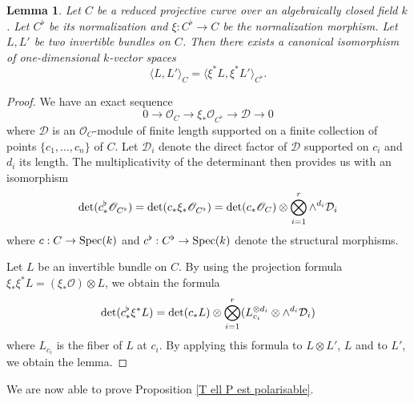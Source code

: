 \documentclass[12pt,english]{smfart}
\numberwithin{equation}{subsection}
\newtheorem{lemme}[equation]{Lemma}
\theoremstyle{remark}
\newcommand\calO{{\mathscr O}}
\newcommand\Spec{{\rm Spec}}
\begin{document}
\begin{lemme}\label{normalisation Weil pairing}
Let $C$ be a reduced projective curve over an algebraically closed field $k$. Let $C^\flat$ be its normalization and $\xi:C^\flat \rightarrow C$ be the normalization morphism. Let $L,L'$ be two invertible bundles on $C$. Then there exists a canonical isomorphism of one-dimensional $k$-vector spaces
$$\langle L,L'\rangle_{C}=\langle \xi^*L,\xi^*L' \rangle_{C^\flat}.$$
\end{lemme}

\begin{proof} We have an exact sequence
$$0\longrightarrow \calO_C \longrightarrow \xi_* \calO_{C^\flat} \longrightarrow \mathcal{D} \longrightarrow 0$$
where $\mathcal{D}$ is an $\calO_C$-module of finite length supported on a finite collection of points $\{c_1,\ldots,c_n\}$ of $C$. Let $\mathcal{D}_i$ denote the direct factor of $\mathcal{D}$ supported on $c_i$ and $d_i$ its length. The multiplicativity of the determinant then provides us with an isomorphism
$${\rm det}(c^\flat_*\calO_{C^\flat})={\rm det}(c_*\xi_*\calO_{C^\flat})={\rm det}(c_*\calO_{C})\otimes\bigotimes_{i=1}^r \wedge^{d_i} \mathcal{D}_i$$
where $c:C\rightarrow\Spec(k)$ and $c^\flat:C^\flat\rightarrow \Spec(k)$ denote the structural morphisms.

Let $L$ be an invertible bundle on $C$. By using the projection formula $\xi_* \xi^* L=(\xi_*\calO)\otimes L$, we obtain the formula
$${\rm det}(c^\flat_*\xi^*L)={\rm det}(c_*L)\otimes\bigotimes_{i=1}^r (L_{c_i}^{\otimes d_i}\otimes \wedge^{d_i} \mathcal{D}_i)$$
where $L_{c_i}$ is the fiber of $L$ at $c_i$. By applying this formula to $L\otimes L'$, $L$ and to $L'$, we obtain the lemma.
\end{proof}

We are now able to prove Proposition \ref{T ell P est polarisable}.
\end{document}
